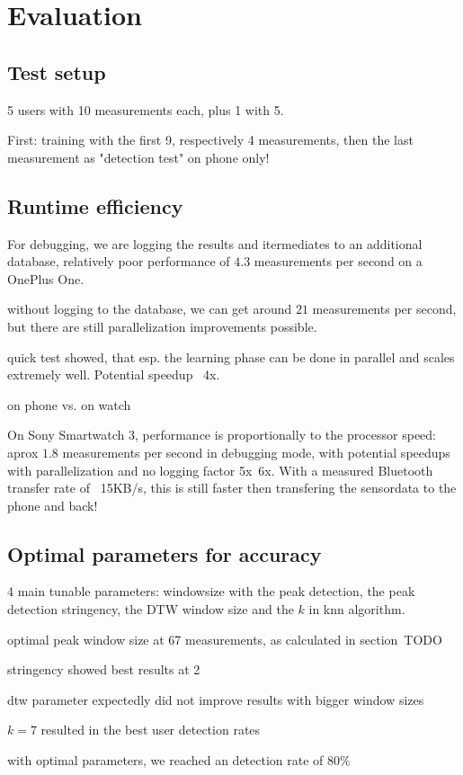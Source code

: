 \chapter{Evaluation}\label{chapter:evaluation}

\section{Test setup}

5 users with 10 measurements each, plus 1 with 5.

First: training with the first 9, respectively 4 measurements, then the last measurement as "detection test" on phone only!



\section{Runtime efficiency}

For debugging, we are logging the results and itermediates to an additional database, relatively poor performance of $4.3$ measurements per second on a OnePlus One.

without logging to the database, we can get around $21$ measurements per second, but there are still parallelization improvements possible.

quick test showed, that esp. the learning phase can be done in parallel and scales extremely well. Potential speedup ~4x.

on phone vs. on watch

On Sony Smartwatch 3, performance is proportionally to the processor speed: aprox $1.8$ measurements per second in debugging mode, with potential speedups with parallelization and no logging factor 5x~6x. With a measured Bluetooth transfer rate of ~15KB/s, this is still faster then transfering the sensordata to the phone and back!

\section{Optimal parameters for accuracy}

4 main tunable parameters: windowsize with the peak detection, the peak detection stringency, the DTW window size and the $k$ in knn algorithm.

optimal peak window size at 67 measurements, as calculated in section~TODO

stringency showed best results at 2

dtw parameter expectedly did not improve results with bigger window sizes

$k = 7$ resulted in the best user detection rates

with optimal parameters, we reached an detection rate of 80\%

